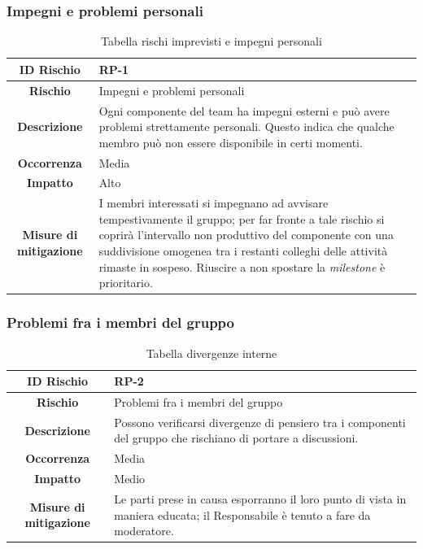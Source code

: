 \documentclass[10pt, a4paper]{article}
\begin{document}
{\subsubsection{Impegni e problemi personali}
{\renewcommand{\arraystretch}{1.5}
\begin{table}[H]
\begin{tabularx}{\textwidth}{c|X}
\textbf{ID Rischio} & RP-1 \\
\hline
\textbf{Rischio} & Impegni e problemi personali\\
\hline
\textbf{Descrizione} & Ogni componente del team ha impegni esterni e può avere problemi strettamente personali. Questo indica che qualche membro può non essere disponibile in certi momenti.\\
\hline
\textbf{Occorrenza} & Media\\
\hline
\textbf{Impatto} & Alto\\
\hline
\textbf{Misure di mitigazione} & I membri interessati si impegnano ad avvisare tempestivamente il gruppo; per far fronte a tale rischio si coprirà l’intervallo non produttivo del componente con una suddivisione omogenea tra i restanti colleghi delle attività rimaste in sospeso.
Riuscire a non spostare la \textit{milestone} è prioritario.\\
\end{tabularx}
\caption{Tabella rischi imprevisti e impegni personali}
\end{table}}




\subsubsection{Problemi fra i membri del gruppo}

{\renewcommand{\arraystretch}{1.5}
\begin{table}[H]
\begin{tabularx}{\textwidth}{c|X}
\textbf{ID Rischio} & RP-2 \\
\hline
\textbf{Rischio} & Problemi fra i membri del gruppo  \\
\hline
\textbf{Descrizione} & Possono verificarsi divergenze di pensiero tra i componenti del gruppo che rischiano di portare a discussioni. \\
\hline
\textbf{Occorrenza} & Media\\
\hline
\textbf{Impatto} & Medio \\
\hline
\textbf{Misure di mitigazione} & Le parti prese in causa esporranno il loro punto di vista in maniera educata; il Responsabile è tenuto a fare da moderatore. \\
\end{tabularx}
\caption{Tabella divergenze interne}
\end{table}
}


}
\end{document}
